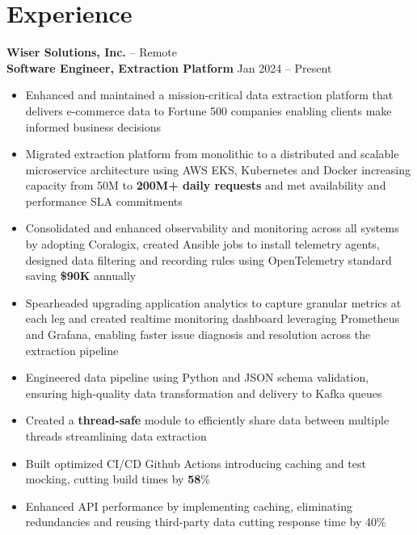 \documentclass[11pt]{article}       %
\begin{document}
\section*{Experience}
\textbf{Wiser Solutions, Inc.} -- Remote \\
\textbf{Software Engineer, Extraction Platform} \hfill Jan 2024 -- Present \\
\vspace{-9pt}
\begin{itemize}
  \item Enhanced and maintained a mission-critical data extraction platform that delivers e-commerce data to Fortune 500 companies enabling clients make informed business decisions \\
  \item Migrated extraction platform from monolithic to a distributed and scalable microservice architecture using AWS EKS, Kubernetes and Docker increasing capacity from 50M to \textbf{200M+ daily requests} and met availability and performance SLA commitments \\
  \item Consolidated and enhanced observability and monitoring across all systems by adopting Coralogix, created Ansible jobs to install telemetry agents, designed data filtering and recording rules using OpenTelemetry standard saving \textbf{\$90K} annually \\
  \item Spearheaded upgrading application analytics to capture granular metrics at each leg and created realtime monitoring dashboard leveraging Prometheus and Grafana, enabling faster issue diagnosis and resolution across the extraction pipeline \\
  \item Engineered data pipeline using Python and JSON schema validation, ensuring high-quality data transformation and delivery to Kafka queues \\
  \item Created a \textbf{thread-safe} module to efficiently share data between multiple threads streamlining data extraction \\
  \item Built optimized CI/CD Github Actions introducing caching and test mocking, cutting build times by \textbf{58}\% \\
  \item Enhanced API performance by implementing caching, eliminating redundancies and reusing third-party data cutting response time by 40\% \\
\end{itemize}
\end{document}
